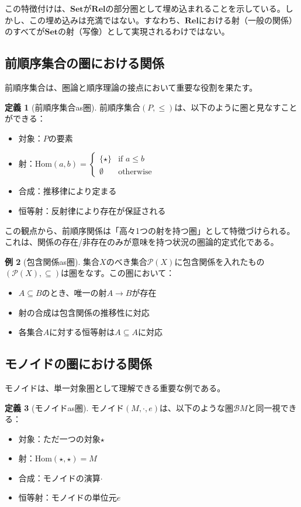 \documentclass[11pt,a4paper,twocolumn]{ltjsarticle}
\theoremstyle{definition}
\newtheorem{definition}{定義}[section]
\newtheorem{example}[definition]{例}
\theoremstyle{plain}
\newcommand{\Set}{\mathbf{Set}}
\newcommand{\Rel}{\mathbf{Rel}}
\newcommand{\Hom}{\mathrm{Hom}}
\begin{document}
この特徴付けは、$\Set$が$\Rel$の部分圏として埋め込まれることを示している。しかし、この埋め込みは充満ではない。すなわち、$\Rel$における射（一般の関係）のすべてが$\Set$の射（写像）として実現されるわけではない。

\subsection{前順序集合の圏における関係}

前順序集合は、圏論と順序理論の接点において重要な役割を果たす。

\begin{definition}[前順序集合as圏]
前順序集合$(P, \leq)$は、以下のように圏と見なすことができる：
\begin{itemize}
\item 対象：$P$の要素
\item 射：$\Hom(a, b) = \begin{cases}
\{\star\} & \text{if } a \leq b \\
\emptyset & \text{otherwise}
\end{cases}$
\item 合成：推移律により定まる
\item 恒等射：反射律により存在が保証される
\end{itemize}
\end{definition}

この観点から、前順序関係は「高々1つの射を持つ圏」として特徴づけられる。これは、関係の存在/非存在のみが意味を持つ状況の圏論的定式化である。

\begin{example}[包含関係as圏]
集合$X$のべき集合$\mathcal{P}(X)$に包含関係を入れたもの$(\mathcal{P}(X), \subseteq)$は圏をなす。この圏において：
\begin{itemize}
\item $A \subseteq B$のとき、唯一の射$A \to B$が存在
\item 射の合成は包含関係の推移性に対応
\item 各集合$A$に対する恒等射は$A \subseteq A$に対応
\end{itemize}
\end{example}

\subsection{モノイドの圏における関係}

モノイドは、単一対象圏として理解できる重要な例である。

\begin{definition}[モノイドas圏]
モノイド$(M, \cdot, e)$は、以下のような圏$\mathcal{B}M$と同一視できる：
\begin{itemize}
\item 対象：ただ一つの対象$\star$
\item 射：$\Hom(\star, \star) = M$
\item 合成：モノイドの演算$\cdot$
\item 恒等射：モノイドの単位元$e$
\end{itemize}
\end{definition}
\end{document}
